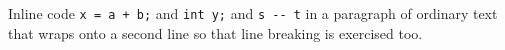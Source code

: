 \documentclass{article}
\begin{document}
\lstset{basicstyle=\ttfamily}
Inline code \lstinline|x = a + b;| and \lstinline{int y;} and \lstinline!s -- t! in a paragraph
of ordinary text that wraps onto a second line so that line breaking is exercised too.
\end{document}
